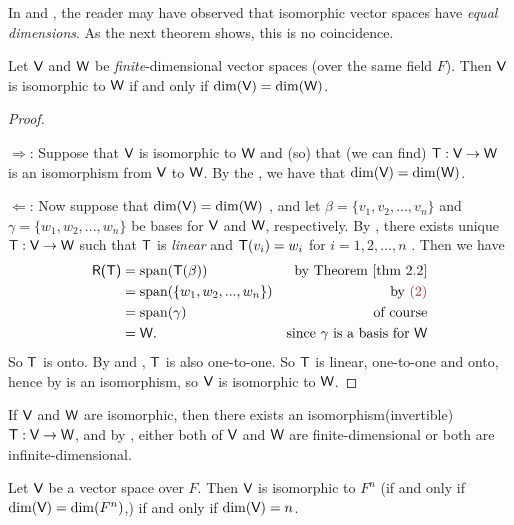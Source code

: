 In  and , the reader may have observed that isomorphic vector spaces have \emph{equal dimensions}.
As the next theorem shows, this is no coincidence.

\begin{theorem} \label{thm 2.19}
Let \(\textsf{V}\) and \(\textsf{W}\) be \emph{finite}-dimensional vector spaces (over the same field \(F\)).
Then \(\textsf{V}\) is isomorphic to \(\textsf{W}\) if and only if \(\dim(\textsf{V}) = \dim(\textsf{W})\).
\end{theorem}

\begin{proof} \ 

\(\Longrightarrow\): Suppose that \(\textsf{V}\) is isomorphic to \(\textsf{W}\) and (so) that (we can find) \(\textsf{T}: \textsf{V} \to \textsf{W}\) is an isomorphism from \(\textsf{V}\) to \(\textsf{W}\).
By the , we have that \(\dim(\textsf{V}) = \dim(\textsf{W})\).

\(\Longleftarrow\): Now suppose that \(\dim(\textsf{V}) = \dim(\textsf{W})\) , and let \(\beta = \{ v_1, v_2, ..., v_n \}\) and \(\gamma = \{ w_1, w_2, ..., w_n \}\) be bases for \(\textsf{V}\) and \(\textsf{W}\), respectively.
By , there exists unique \(\textsf{T} : \textsf{V} \to \textsf{W}\) such that \(\textsf{T}\) is \emph{linear} and \(\textsf{T}(v_i) = w_i\) for \(i = 1, 2, ..., n\) .
Then we have
\begin{align*}
    \RANGET & = \spann(\T(\beta)) & \text{by \THM{2.2}} \\
            & = \spann(\{ w_1, w_2, ..., w_n \}) & \text{by \MAROON{(2)}} \\
            & = \spann(\gamma) & \text{of course} \\
            & = \W. & \text{since \(\gamma\) is a basis for \(\W\)}
\end{align*}
So \(\textsf{T}\) is onto.
By  and , \(\textsf{T}\) is also one-to-one.
So \(\textsf{T}\) is linear, one-to-one and onto, hence by  is an isomorphism, so \(\textsf{V}\) is isomorphic to \(\textsf{W}\).
\end{proof}

\begin{remark} \label{remark 2.4.4}
If \(\textsf{V}\) and \(\textsf{W}\) are isomorphic, then there exists an isomorphism(invertible) \(\textsf{T} : \textsf{V} \to \textsf{W}\),
and by , either both of \(\textsf{V}\) and \(\textsf{W}\) are finite-dimensional or both are infinite-dimensional.
\end{remark}

\begin{corollary} \label{corollary 2.19.1}
Let \(\textsf{V}\) be a vector space over \(F\).
Then \(\textsf{V}\) is isomorphic to \(F^n\) (if and only if \(\dim(\textsf{V}) = \dim(F^n)\),) if and only if \(\dim(\textsf{V}) = n\).
\end{corollary}

